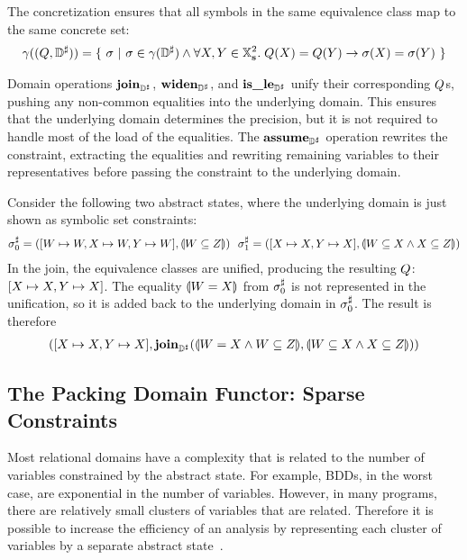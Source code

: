 The concretization ensures that all symbols in the same equivalence class map to the same concrete set:
\begin{align*}
\gamma((Q,{\mathbb{D}}^{\sharp})) = \{ \ \sigma \ | \ \sigma \in \gamma({\mathbb{D}}^{\sharp}) \wedge \forall X,Y \in \mathbb{X}_{\bf s}^2. \; Q(X) = Q(Y) \rightarrow \sigma(X) = \sigma(Y) \ \}
\end{align*}

Domain operations $\textbf{join}_{{\mathbb{D}}^{\sharp}}$, $\textbf{widen}_{{\mathbb{D}}^{\sharp}}$, and $\textbf{is\_le}_{{\mathbb{D}}^{\sharp}}$ unify their corresponding $Q$s, pushing any non-common equalities into the underlying domain.  This ensures that the underlying domain determines the precision, but it is not required to handle most of the load of the equalities.  The $\textbf{assume}_{{\mathbb{D}}^{\sharp}}$ operation rewrites the constraint, extracting the equalities and rewriting remaining variables to their representatives before passing the constraint to the underlying domain.
 

\begin{example}
Consider the following two abstract states, where the underlying domain is just shown as symbolic set constraints:
\begin{align*}
  \astate_0 = ([\setvw \mapsto \setvw, \setvx \mapsto \setvw, \setvy \mapsto \setvw], \aform{\setvw \subseteq \setvz}) \ \ 
  \astate_1 = ([\setvx \mapsto \setvx, \setvy \mapsto \setvx], \aform{\setvw \subseteq \setvx \wedge \setvx \subseteq \setvz})
\end{align*}
In the join, the equivalence classes are unified, producing the resulting $Q$: $[X \mapsto X, Y \mapsto X]$.  The equality $\llparenthesis W = X \rrparenthesis$ from ${\sigma}^{\sharp}_0$ is not represented in the unification, so it is added back to the underlying domain in ${\sigma}^{\sharp}_0$.  The result is therefore
\begin{align*}
  ([X \mapsto X, Y \mapsto X], \textbf{join}_{{\mathbb{D}}^{\sharp}}(\llparenthesis W = X \wedge W \subseteq Z \rrparenthesis, \llparenthesis W \subseteq X \wedge X \subseteq Z \rrparenthesis))
\end{align*}
\end{example}

\subsection{The Packing Domain Functor: Sparse Constraints}
\label{s:4:5:packs}
Most relational domains have a complexity that is related to the number of variables constrained by the abstract state.  For example, BDDs, in the worst case, are exponential in the number of variables.  However, in many programs, there are relatively small clusters of variables that are related.  Therefore it is possible to increase the efficiency of an analysis by representing each cluster of variables by a separate abstract state~\cite{ens:pldi:03}.

